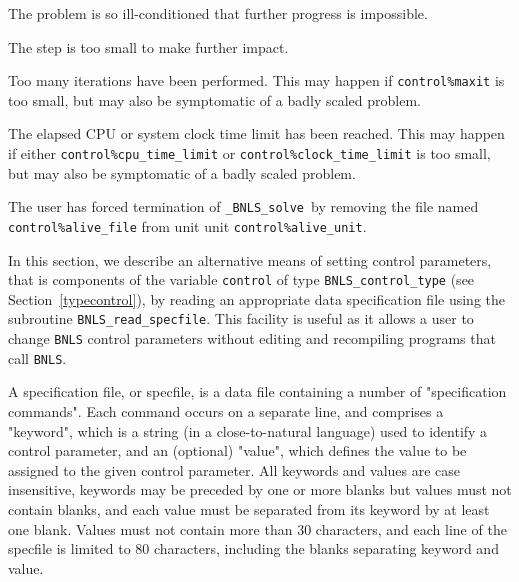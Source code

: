 \documentclass{galahad}
\newcommand{\packagename}{BNLS}
\newcommand{\fullpackagename}{\libraryname\_\packagename}
\newcommand{\solver}{{\tt \fullpackagename\_solve}}
\begin{document}
\begin{description}
 The problem is so ill-conditioned that
  further progress is impossible.

 The step is too small to make further impact.

 Too many iterations have been performed.
  This may happen if {\tt control\%maxit} is too small, but may also 
  be symptomatic of a badly scaled problem.

 The elapsed CPU or system clock time limit has been
    reached. This may happen if either {\tt control\%cpu\_time\-\_limit} or
    {\tt control\%clock\_time\_limit} is too small, but may also be symptomatic
    of a badly scaled problem.

 The user has forced termination of \solver\
     by removing the file named {\tt control\%a\-live\_file} from unit
     unit {\tt control\%alive\_unit}.

\end{description}


\galfeatures
\noindent In this section, we describe an alternative means of setting
control parameters, that is components of the variable {\tt control} of type
{\tt \packagename\_control\_type}
(see Section~\ref{typecontrol}),
by reading an appropriate data specification file using the
subroutine {\tt \packagename\_read\_specfile}. This facility
is useful as it allows a user to change  {\tt \packagename} control parameters
without editing and recompiling programs that call {\tt \packagename}.

A specification file, or specfile, is a data file containing a number of
"specification commands". Each command occurs on a separate line,
and comprises a "keyword",
which is a string (in a close-to-natural language) used to identify a
control parameter, and
an (optional) "value", which defines the value to be assigned to the given
control parameter. All keywords and values are case insensitive,
keywords may be preceded by one or more blanks but
values must not contain blanks, and
each value must be separated from its keyword by at least one blank.
Values must not contain more than 30 characters, and
each line of the specfile is limited to 80 characters,
including the blanks separating keyword and value.
\end{document}
